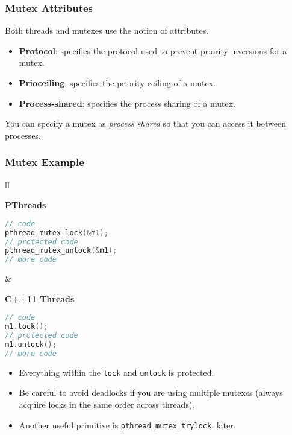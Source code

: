 \begin{frame}
\frametitle{Mutex Attributes}

 Both threads and mutexes use the notion of attributes.
 

  \begin{itemize}
    \item {\bf Protocol}: specifies the protocol used to prevent priority
      inversions for a mutex.
    \item {\bf Prioceiling}: specifies the priority ceiling of a mutex.
    \item {\bf Process-shared}: specifies the process sharing of a mutex.
  \end{itemize}
  
  You can specify a mutex as {\it process shared} so that you can access it
  between processes.

\end{frame}



\begin{frame}[fragile]
\frametitle{Mutex Example}

   \begin{tabular}{ll}
      \begin{minipage}{.5\textwidth}
        {\bf PThreads}
  \begin{lstlisting}[language=C]
// code
pthread_mutex_lock(&m1);
// protected code
pthread_mutex_unlock(&m1);
// more code
  \end{lstlisting}
      \end{minipage}&
      \begin{minipage}{.35\textwidth}
        {\bf C++11 Threads}
  \begin{lstlisting}[language=C]
// code
m1.lock();
// protected code
m1.unlock();
// more code
  \end{lstlisting}
      \end{minipage}
    \end{tabular}

  \begin{itemize}
    \item Everything within the {\tt lock} and {\tt unlock} is protected.
    \item Be careful to avoid deadlocks if you are using multiple mutexes (always
acquire locks in the same order across threads).
    \item Another useful primitive is {\tt pthread\_mutex\_trylock}.
later.
  \end{itemize}


\end{frame}



